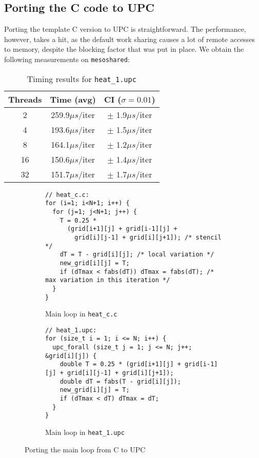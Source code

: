 \documentclass[12pt]{article}
\newcommand{\us}[0]{${\mu}s$}
\begin{document}


\newpage

\subsection{Porting the C code to UPC}

Porting the template C version to UPC is straightforward.
The performance, however, takes a hit, as the default work sharing causes a lot of remote accesses to memory, despite the blocking factor that was put in place.
We obtain the following measurements on \texttt{mesoshared}:

\begin{table}[ht]
  \centering\begin{tabular}{|c|c|c|}
    \hline
    Threads & Time (avg) & CI ($\sigma=0.01$) \\
    \hline
    2 & 259.9\us/iter & $\pm$ 1.9\us/iter \\
    4 & 193.6\us/iter & $\pm$ 1.5\us/iter \\
    8 & 164.1\us/iter & $\pm$ 1.2\us/iter \\
    16 & 150.6\us/iter & $\pm$ 1.4\us/iter \\
    32 & 151.7\us/iter & $\pm$ 1.7\us/iter \\
    \hline
  \end{tabular}
  \caption{Timing results for \texttt{heat\_1.upc}}
  \label{tab:heat1}
\end{table}

\begin{figure}[ht]
  \begin{subfigure}[b]{0.49\columnwidth}
    \begin{lstlisting}[style=C, numbers=none]
// heat_c.c:
for (i=1; i<N+1; i++) {
  for (j=1; j<N+1; j++) {
    T = 0.25 *
      (grid[i+1][j] + grid[i-1][j] +
        grid[i][j-1] + grid[i][j+1]); /* stencil */
    dT = T - grid[i][j]; /* local variation */
    new_grid[i][j] = T;
    if (dTmax < fabs(dT)) dTmax = fabs(dT); /* max variation in this iteration */
  }
}
    \end{lstlisting}
    \caption{Main loop in \texttt{heat\_c.c}}
  \end{subfigure}
  \hfill
  \begin{subfigure}[b]{0.49\columnwidth}
    \begin{lstlisting}[style=C, numbers=none]
// heat_1.upc:
for (size_t i = 1; i <= N; i++) {
  upc_forall (size_t j = 1; j <= N; j++; &grid[i][j]) {
    double T = 0.25 * (grid[i+1][j] + grid[i-1][j] + grid[i][j-1] + grid[i][j+1]);
    double dT = fabs(T - grid[i][j]);
    new_grid[i][j] = T;
    if (dTmax < dT) dTmax = dT;
  }
}
    \end{lstlisting}
    \caption{Main loop in \texttt{heat\_1.upc}}
  \end{subfigure}
  \caption{Porting the main loop from C to UPC}
  \label{fig:heatc1}
\end{figure}
\end{document}
